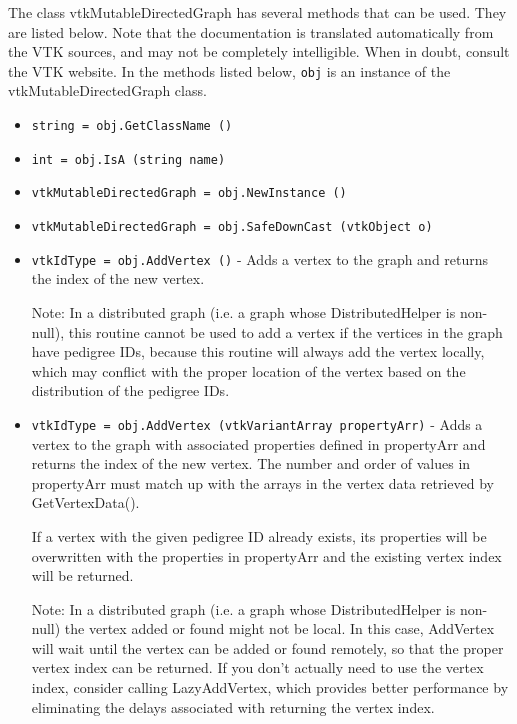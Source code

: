 The class vtkMutableDirectedGraph has several methods that can be used.
  They are listed below.
Note that the documentation is translated automatically from the VTK sources,
and may not be completely intelligible.  When in doubt, consult the VTK website.
In the methods listed below, \verb|obj| is an instance of the vtkMutableDirectedGraph class.
\begin{itemize}
\item  \verb|string = obj.GetClassName ()|

\item  \verb|int = obj.IsA (string name)|

\item  \verb|vtkMutableDirectedGraph = obj.NewInstance ()|

\item  \verb|vtkMutableDirectedGraph = obj.SafeDownCast (vtkObject o)|

\item  \verb|vtkIdType = obj.AddVertex ()| -  Adds a vertex to the graph and returns the index of the new vertex.

 Note: In a distributed graph (i.e. a graph whose DistributedHelper
 is non-null), this routine cannot be used to add a vertex
 if the vertices in the graph have pedigree IDs, because this routine
 will always add the vertex locally, which may conflict with the
 proper location of the vertex based on the distribution of the
 pedigree IDs.

\item  \verb|vtkIdType = obj.AddVertex (vtkVariantArray propertyArr)| -  Adds a vertex to the graph with associated properties defined in
  propertyArr and returns the index of the new vertex.
 The number and order of values in  propertyArr must match up with the
 arrays in the vertex data retrieved by GetVertexData().
 
 If a vertex with the given pedigree ID already exists, its properties will be
 overwritten with the properties in  propertyArr and the existing
 vertex index will be returned.

 Note: In a distributed graph (i.e. a graph whose DistributedHelper
 is non-null) the vertex added or found might not be local. In this case,
 AddVertex will wait until the vertex can be added or found
 remotely, so that the proper vertex index can be returned. If you
 don't actually need to use the vertex index, consider calling
 LazyAddVertex, which provides better performance by eliminating
 the delays associated with returning the vertex index.


\end{itemize}
